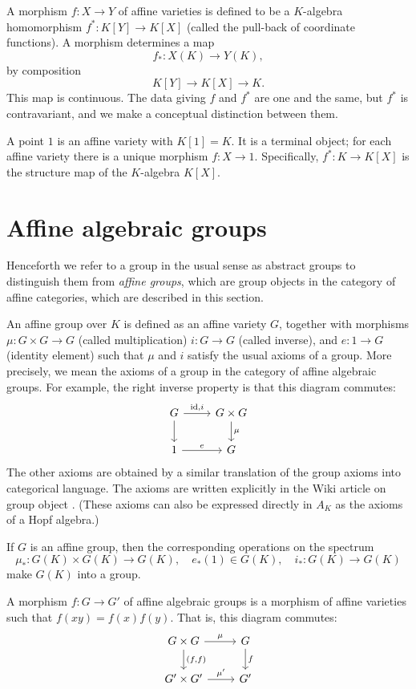 A morphism $f:X \to Y$ of affine varieties is defined to be a
$K$-algebra homomorphism $f^*:K[Y]\to K[X]$ (called the pull-back of
coordinate functions).  A morphism determines a map
\[
f_*: X(K) \to Y(K),
\]
by composition
\[
K[Y] \to K[X] \to K.
\]
This map is continuous.  The data giving $f$ and $f^*$ are one and the
same, but $f^*$ is contravariant, and we make a conceptual distinction
between them.

A point $1$ is an affine variety with $K[1]=K$.  It is a terminal
object; for each affine variety there is a unique morphism $f:X\to 1$.
Specifically, $f^*:K\to K[X]$ is the structure map of the $K$-algebra
$K[X]$.


\section{Affine algebraic groups}

Henceforth we refer to a group in the usual sense as abstract groups
to distinguish them from {\it affine groups}, which are group objects
in the category of affine categories, which are described in this
section.

An affine group over $K$ is defined as an affine variety
$G$, together with morphisms $\mu:G \times G \to G$ (called
multiplication) $i:G \to G$ (called inverse), and $e:1\to G$ (identity
element) such that $\mu$ and $i$ satisfy the usual axioms of a
group. More precisely, we mean the axioms of a group in the category
of affine algebraic groups.  For example, the right inverse property
is that this diagram commutes:
\[
\begin{tikzcd}
  G \arrow{r}{\op{id},i} \arrow{d} & G\times G \arrow{d}{\mu} \\
  1 \arrow{r}{e} & G
  \end{tikzcd}
\]
The other axioms are obtained by a similar translation of the group
axioms into categorical language.  The axioms are written explicitly
in the Wiki article on group object \cite{group-object}.  (These
axioms can also be expressed directly in $A_K$ as the axioms of a Hopf
algebra.)

If $G$ is an affine group, then the corresponding operations
on the spectrum
\[
\mu_*:G(K)\times G(K)\to G(K),\quad e_*(1)\in G(K),\quad i_*:G(K)\to G(K)
\]
make $G(K)$ into a group.


A morphism $f:G\to G'$ of affine algebraic groups is a morphism
of affine varieties such that $f(x y) = f(x) f(y)$.  That is,
this diagram commutes:
\[
\begin{tikzcd}
  G \times G \arrow{r}{\mu} \arrow{d}{(f,f)} & G \arrow{d}{f} \\
  G' \times G' \arrow{r}{\mu'} & G'
  \end{tikzcd}
\]

